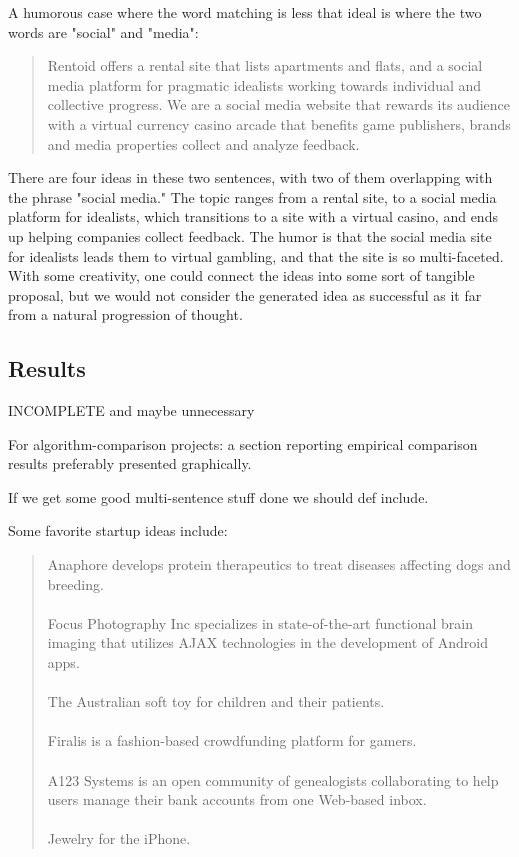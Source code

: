 \documentclass[11pt]{article}
\begin{document}
A humorous case where the word matching is less that ideal is where the two words are "social" and "media":
\begin{quote}
Rentoid offers a rental site that lists apartments and flats, and a social media platform for pragmatic idealists working towards individual and collective progress. We are a social media website that rewards its audience with a virtual currency casino arcade that benefits game publishers, brands and media properties collect and analyze feedback.
\end{quote}
There are four ideas in these two sentences, with two of them overlapping with the phrase "social media." The topic ranges from a rental site, to a social media platform for idealists, which transitions to a site with a virtual casino, and ends up helping companies collect feedback. The humor is that the social media site for idealists leads them to virtual gambling, and that the site is so multi-faceted. With some creativity, one could connect the ideas into some sort of tangible proposal, but we would not consider the generated idea as successful as it far from a natural progression of thought.

\subsection{Results}
INCOMPLETE and maybe unnecessary

For algorithm-comparison projects: a section reporting empirical comparison results preferably presented graphically.

If we get some good multi-sentence stuff done we should def include.

Some favorite startup ideas include:
\begin{quote}
Anaphore develops protein therapeutics to treat diseases affecting dogs and breeding.\\\\
Focus Photography Inc specializes in state-of-the-art functional brain imaging that utilizes AJAX technologies in the development of Android apps.\\\\
The Australian soft toy for children and their patients.\\\\
Firalis is a fashion-based crowdfunding platform for gamers.\\\\
A123 Systems is an open community of genealogists collaborating to help users manage their bank accounts from one Web-based inbox.\\\\
Jewelry for the iPhone.
\end{quote}
\end{document}
